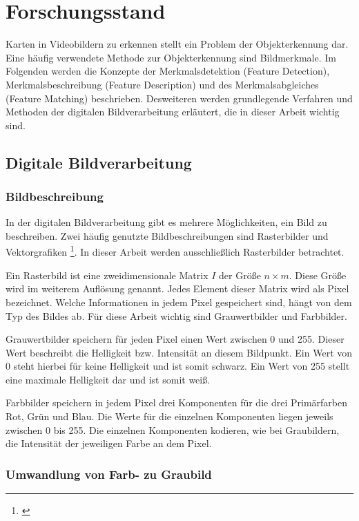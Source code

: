 \section{Forschungsstand}\raggedbottom 
Karten in Videobildern zu erkennen stellt ein Problem der Objekterkennung dar.
Eine häufig verwendete Methode zur Objekterkennung sind Bildmerkmale.
Im Folgenden werden die Konzepte der Merkmalsdetektion (Feature Detection), Merkmalsbeschreibung (Feature Description) und des Merkmalsabgleiches (Feature Matching) beschrieben.
Desweiteren werden grundlegende Verfahren und Methoden der digitalen Bildverarbeitung erläutert, die in dieser Arbeit wichtig sind.

\subsection{Digitale Bildverarbeitung}

\subsubsection{Bildbeschreibung}

In der digitalen Bildverarbeitung gibt es mehrere Möglichkeiten, ein Bild zu beschreiben. Zwei häufig genutzte Bildbeschreibungen sind Rasterbilder und Vektorgrafiken \footnote{\cite[S. 15]{Burg06}}. In dieser Arbeit werden ausschließlich Rasterbilder betrachtet.

Ein Rasterbild ist eine zweidimensionale Matrix $I$ der Größe $n \times m$. Diese Größe wird im weiterem Auflösung genannt. Jedes Element dieser Matrix wird als Pixel bezeichnet.
Welche Informationen in jedem Pixel gespeichert sind, hängt von dem Typ des Bildes ab. Für diese Arbeit wichtig sind Grauwertbilder und Farbbilder.

Grauwertbilder speichern für jeden Pixel einen Wert zwischen 0 und 255. Dieser Wert beschreibt die Helligkeit bzw. Intensität an diesem Bildpunkt. Ein Wert von 0 steht hierbei für keine Helligkeit und ist somit schwarz. Ein Wert von 255 stellt eine maximale Helligkeit dar und ist somit weiß. 

Farbbilder speichern in jedem Pixel drei Komponenten für die drei Primärfarben Rot, Grün und Blau. Die Werte für die einzelnen Komponenten liegen jeweils zwischen 0 bis 255. Die einzelnen Komponenten kodieren, wie bei Graubildern, die Intensität der jeweiligen Farbe an dem Pixel.

\subsubsection{Umwandlung von Farb- zu Graubild}

